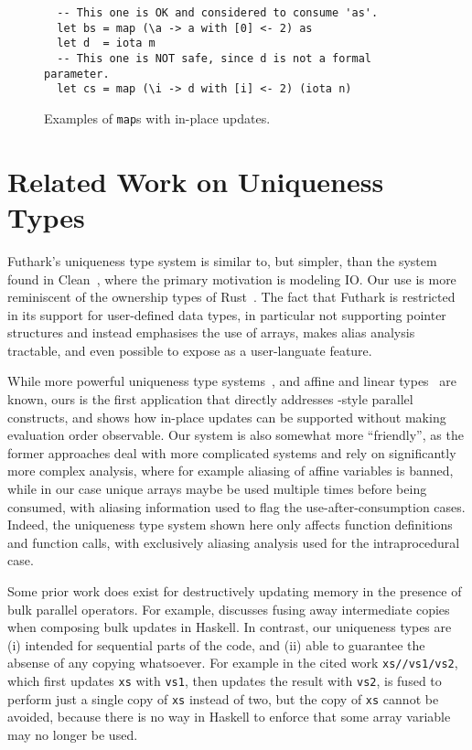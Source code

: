 \begin{figure}
\begin{lstlisting}
  -- This one is OK and considered to consume 'as'.
  let bs = map (\a -> a with [0] <- 2) as
  let d  = iota m
  -- This one is NOT safe, since d is not a formal parameter.
  let cs = map (\i -> d with [i] <- 2) (iota n)
\end{lstlisting}
  \caption{Examples of \lstinline{map}s with in-place updates.}
  \label{fig:map-in-place-update}
\end{figure}

\section{Related Work on Uniqueness Types}

Futhark's uniqueness type system is similar to, but simpler, than the
system found in
Clean~\cite{clean-uniqueness-types,barendsen1996uniqueness}, where the
primary motivation is modeling IO.  Our use is more reminiscent of the
ownership types of Rust~\cite{rust}.  The fact that Futhark is
restricted in its support for user-defined data types, in particular
not supporting pointer structures and instead emphasises the use of
arrays, makes alias analysis tractable, and even possible to expose as
a user-languate feature.

While more powerful uniqueness type
systems~\cite{clean-uniqueness-types}, and affine and linear
types~\cite{Tov:2011:PAT:1926385.1926436,Fahndrich:2002:AFP:543552.512532}
are known, ours is the first application that directly addresses
-style parallel constructs, and shows how in-place updates can
be supported without making evaluation order observable.  Our system
is also somewhat more ``friendly'', as the former approaches deal with
more complicated systems and rely on significantly more complex
analysis, where for example aliasing of affine variables is banned,
while in our case unique arrays maybe be used multiple times before
being consumed, with aliasing information used to flag the
use-after-consumption cases.  Indeed, the uniqueness type system shown
here only affects function definitions and function calls, with
exclusively aliasing analysis used for the intraprocedural case.

Some prior work does exist for destructively updating memory in the
presence of bulk parallel operators. For example,
\cite{Leshchinskiy2009} discusses fusing away intermediate copies when
composing bulk updates in Haskell.  In contrast, our uniqueness types
are (i) intended for sequential parts of the code, and (ii) able to
guarantee the absense of any copying whatsoever.  For example in the
cited work \texttt{xs//vs1/vs2}, which first updates \texttt{xs} with
\texttt{vs1}, then updates the result with \texttt{vs2}, is fused to
perform just a single copy of \texttt{xs} instead of two, but the copy
of \texttt{xs} cannot be avoided, because there is no way in Haskell
to enforce that some array variable may no longer be used.

